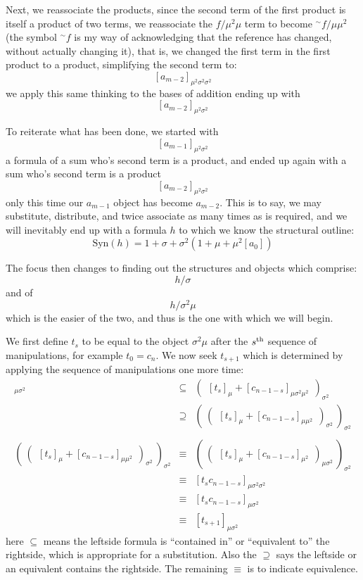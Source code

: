 \documentclass[twoside]{article}
\begin{document}
Next, we reassociate the products, since the second term of the first product is itself a product of two terms,
we reassociate the $ f/\mu^2\mu $ term to become $ ^{\sim} f/\mu\mu^2 $ (the symbol $ ^{\sim} f $ is my way of
acknowledging that the reference has changed, without actually changing it), that is, we changed the first term
in the first product to a product, simplifying the second term to:
$$ [a_{m-2}]_{\mu^2\sigma^2\sigma^2} $$
we apply this same thinking to the bases of addition ending up with
$$ [a_{m-2}]_{\mu^2\sigma^2} $$

To reiterate what has been done, we started with
$$ [a_{m-1}]_{\mu^2\sigma^2} $$
a formula of a sum who's second term is a product, and ended up again with a sum who's second term is a product
$$ [a_{m-2}]_{\mu^2\sigma^2} $$
only this time our $ a_{m-1} $ object has become $ a_{m-2} $.  This is to say, we may substitute, distribute, and
twice associate as many times as is required, and we will inevitably end up with a formula $ h $ to which we know the
structural outline:
$$ \mbox{Syn}(h)=1+\sigma+\sigma^2(1+\mu+\mu^2[a_0]) $$

The focus then changes to finding out the structures and objects which comprise:
$$ h/\sigma $$
and of
$$ h/\sigma^2\mu $$
which is the easier of the two, and thus is the one with which we will begin.

We first define $ t_s $ to be equal to the object $ \sigma^2\mu $ after the $ s^{\mbox{\scriptsize th}} $
sequence of manipulations, for example $ t_0=c_n $.  We now seek $ t_{s+1} $ which is determined by applying the
sequence of manipulations one more time:
\begin{eqnarray*}
[t_s]_{\mu\sigma^2} & \subseteq & (\ \ [t_s]_{\mu}+[c_{n-1-s}]_{\mu\sigma^2\mu^2}\ \ )_{\sigma^2} \\
 & \supseteq & (\ (\ \ [t_s]_{\mu}+[c_{n-1-s}]_{\mu\mu^2}\ \ )_{\sigma^2}\ )_{\sigma^2} \\
 & & \\
 (\ (\ \ [t_s]_{\mu}+[c_{n-1-s}]_{\mu\mu^2}\ \ )_{\sigma^2}\ )_{\sigma^2}
 & \equiv & (\ (\ \ [t_s]_{\mu}+[c_{n-1-s}]_{\mu^2}\ \ )_{\mu\sigma^2}\ )_{\sigma^2} \\
 & \equiv & [t_sc_{n-1-s}]_{\mu\sigma^2\sigma^2} \\
 & \equiv & [t_sc_{n-1-s}]_{\mu\sigma^2} \\
 & \equiv & [t_{s+1}]_{\mu\sigma^2}
\end{eqnarray*}
here $ \subseteq $ means the leftside formula is ``contained in'' or ``equivalent to'' the rightside, which is
appropriate for a substitution.  Also the $ \supseteq $ says the leftside or an equivalent contains the rightside.
The remaining $ \equiv $ is to indicate equivalence.
\end{document}
